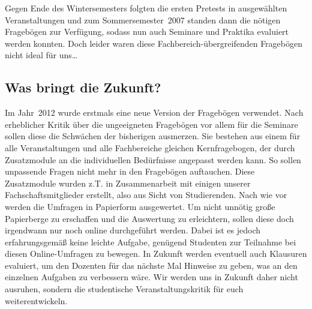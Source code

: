 \begin{multicols}{2}
Gegen Ende des Wintersemesters folgten die ersten Pretests in ausgewählten Veranstaltungen und zum Sommersemester~2007 standen dann die nötigen Fragebögen zur Verfügung, sodass nun auch Seminare und Praktika evaluiert werden konnten. Doch leider waren diese Fachbereich-übergreifenden Fragebögen nicht ideal für uns\dots

\subsection*{Was bringt die Zukunft?}
Im Jahr~2012 wurde erstmals eine neue Version der Fragebögen verwendet. Nach erheblicher Kritik über die ungeeigneten Fragebögen vor allem für die Seminare sollen diese die Schwächen der bisherigen ausmerzen. Sie bestehen aus einem für alle Veranstaltungen und alle Fachbereiche gleichen Kernfragebogen, der durch Zusatzmodule an die individuellen Bedürfnisse angepasst werden kann. So sollen unpassende Fragen nicht mehr in den Fragebögen auftauchen. Diese Zusatzmodule wurden z.T. in Zusammenarbeit mit einigen unserer Fachschaftsmitglieder erstellt, also aus Sicht von Studierenden. Nach wie vor werden die Umfragen in Papierform ausgewertet. Um nicht unnötig große Papierberge zu erschaffen und die Auswertung zu erleichtern, sollen diese doch irgendwann nur noch online durchgeführt werden. Dabei ist es jedoch erfahrungsgemäß keine leichte Aufgabe, genügend Studenten zur Teilnahme bei diesen Online-Umfragen zu bewegen. In Zukunft werden eventuell auch Klausuren evaluiert, um den Dozenten für das nächste Mal Hinweise zu geben, was an den einzelnen Aufgaben zu verbessern wäre. Wir werden uns in Zukunft daher nicht ausruhen, sondern die studentische Veranstaltungskritik für euch weiterentwickeln.

\end{multicols}

